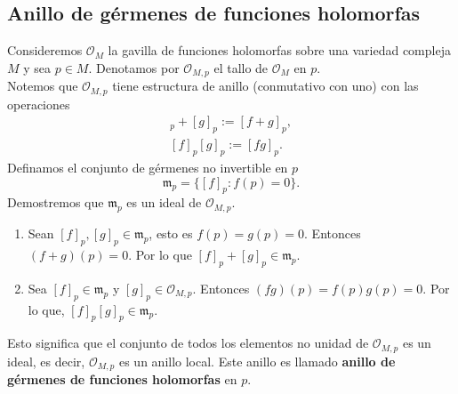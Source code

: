 \subsection{Anillo de gérmenes de funciones holomorfas}
\begin{example}
	Consideremos $\mathscr{O}_M$ la gavilla de funciones holomorfas sobre una variedad compleja $M$ y sea $p\in M$. Denotamos por $\mathscr{O}_{M,p}$ el tallo de $\mathscr{O}_M$ en $p$.\\
	Notemos que $\mathscr{O}_{M,p}$ tiene estructura de anillo (conmutativo con uno) con las operaciones
	\begin{align*}
		[f]_p+[g]_p:=[f+g]_p,\\
		[f]_p[g]_p:=[fg]_p.
	\end{align*}
	Definamos el conjunto de gérmenes no invertible en $p$
	\begin{equation*}
		\mathfrak{m}_p=\{[f]_p:f(p)=0\}.
	\end{equation*}
	Demostremos que $\mathfrak{m}_p$ es un ideal de $\mathscr{O}_{M,p}$.
	\begin{enumerate}
		\item Sean $[f]_p,[g]_p\in \mathfrak{m}_p$, esto es $f(p)=g(p)=0$. Entonces $(f+g)(p)=0$. Por lo que $[f]_p+[g]_p\in\mathfrak{m}_p $.
		\item Sea $[f]_p\in \mathfrak{m}_p$ y $[g]_p\in\mathscr{O}_{M,p}$. Entonces $(fg)(p)=f(p)g(p)=0$.
		Por lo que, $[f]_p[g]_p\in \mathfrak{m}_p$.
	\end{enumerate}
	Esto significa que el conjunto de todos los elementos no unidad de $\mathscr{O}_{M,p}$ es un ideal, es decir, $\mathscr{O}_{M,p}$ es un anillo local. Este anillo es llamado \textbf{anillo de gérmenes de funciones holomorfas} en $p$.
\end{example}

